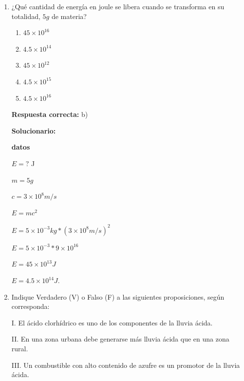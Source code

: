 \begin{enumerate}[resume]
	Pureza $= \dfrac{Masa \: sustancia \: pura \: Fe}{Masa \: del \: mineral \: Fe} \times 100$ \\
	
	Pureza $= \dfrac{224g}{500g} \times 100$ 
	
	Pureza 
	
	\vspace{6mm}
	
	
	
	\item ¿Qué cantidad de energía en joule se libera cuando se transforma en su totalidad, $5g$ de materia?
	
	\begin{enumerate}[label=\alph*)]
		\item $45 \times 10^{16}$
		\item $4.5 \times 10^{14}$
		\item $45 \times 10^{12}$
		\item $4.5 \times 10^{15}$
		\item $4.5 \times 10^{16}$
	\end{enumerate}
	
	\textbf{Respuesta correcta:} b)
	
	\vspace{2mm}
	\textbf{Solucionario:}
	
	\textbf{datos} 
	
	$E = ?$ J 
	
	$m = 5g$ 
	
	$c = 3 \times 10^8 m/s$
	
	$E = mc^2$ 
	
	$E = 5 \times 10^{-3} kg * (3 \times 10^8 m/s)^2$ 
	
	$E = 5 \times 10^{-3} * 9 \times 10^{16}$ 
	
	$E = 45 \times 10^{13} J$ 
	
	$E = 4.5 \times 10^{14} J.$
	
	\vspace{6mm}
	
	\item Indique Verdadero (V) o Falso (F) a las siguientes proposiciones, según corresponda:
	
	I. El ácido clorhídrico es uno de los componentes de la lluvia ácida.
	
	II. En una zona urbana debe generarse más lluvia ácida que en una zona rural.
	
	III. Un combustible con alto contenido de azufre es un promotor de la lluvia ácida.
	

\end{enumerate}
